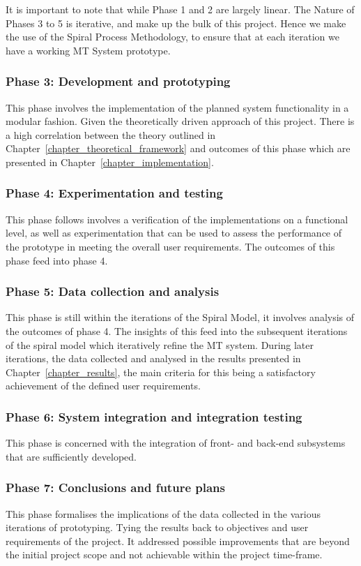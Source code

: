 It is important to note that while Phase 1 and 2 are largely linear. The Nature
of Phases 3 to 5 is iterative, and make up the bulk of this project. Hence we
make the use of the Spiral Process Methodology, to ensure that at each iteration
we have a working MT System prototype.  

\subsubsection{Phase 3: Development and prototyping}
This phase involves the implementation of the planned system functionality in a
modular fashion. Given the theoretically driven approach of this project. There
is a high correlation between the theory outlined in
Chapter~\ref{chapter_theoretical_framework} and outcomes of this phase which are
presented in Chapter~\ref{chapter_implementation}.

\subsubsection{Phase 4: Experimentation and testing}
This phase follows involves a verification of the implementations on a
functional level, as well as experimentation that can be used to assess the
performance of the prototype in meeting the overall user requirements. The
outcomes of this phase feed into phase 4. 

\subsubsection{Phase 5: Data collection and analysis}
This phase is still within the iterations of the Spiral Model, it involves
analysis of the outcomes of phase 4. The insights of this feed into the 
subsequent iterations of the spiral model which iteratively refine the MT
system. 
During later iterations, the data collected and analysed in the results
presented in 
Chapter~\ref{chapter_results}, the main criteria for this being a satisfactory achievement
of the defined user requirements.

\subsubsection{Phase 6: System integration and integration testing}
This phase is concerned with the integration of front- and back-end subsystems that
are sufficiently developed. 

\subsubsection{Phase 7: Conclusions and future plans}
This phase formalises the implications of the data collected in the various
iterations of prototyping. Tying the results back to objectives and user
requirements of the project.
It addressed possible improvements that are beyond the initial project scope
and not achievable within the project time-frame.


